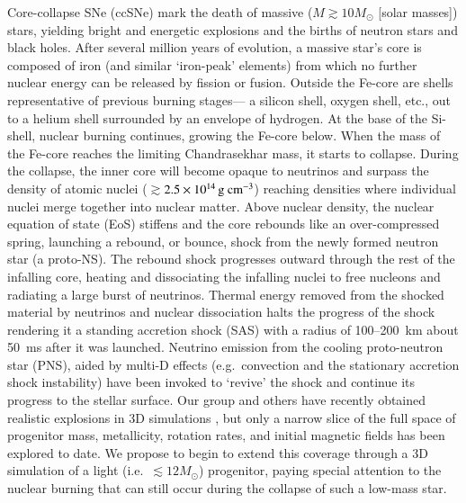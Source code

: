 Core-collapse SNe (ccSNe) mark the death of massive ($M \gtrsim 10
M_{\odot}$ [solar masses]) stars, yielding bright and energetic
explosions and the births of neutron stars and black holes.  After
several million years of evolution, a massive star's core is composed
of iron (and similar `iron-peak' elements) from which no further
nuclear energy can be released by fission or fusion.  Outside the
Fe-core are shells representative of previous burning stages--- a
silicon shell, oxygen shell, etc., out to a helium shell surrounded by
an envelope of hydrogen.  At the base of the Si-shell, nuclear burning
continues, growing the Fe-core below.  When the mass of the Fe-core
reaches the limiting Chandrasekhar mass, it starts to collapse.
During the collapse, the inner core will become opaque to neutrinos
and surpass the density of atomic nuclei
($\gtrsim$$2.5\times10^{14}\,{\mathrm{g~cm^{-3}}}$) reaching densities where
individual nuclei merge together into nuclear matter.  Above nuclear
density, the nuclear equation of state (EoS) stiffens and the core
rebounds like an over-compressed spring, launching a rebound, or
bounce, shock from the newly formed neutron star (a proto-NS).  The
rebound shock progresses outward through the rest of the infalling
core, heating and dissociating the infalling nuclei to free nucleons
and radiating a large burst of neutrinos. Thermal energy removed from
the shocked material by neutrinos and nuclear dissociation halts the
progress of the shock rendering it a standing accretion shock (SAS)
with a radius of 100--200~km about 50~ms after it was
launched. Neutrino emission from the cooling proto-neutron star (PNS),
aided by multi-D effects (e.g.\ convection and the stationary
accretion shock instability) have been invoked to `revive' the shock
and continue its progress to the stellar surface.  Our group and
others have recently obtained realistic explosions in
3D simulations \cite{lentzetal2015,melson}, but only a
narrow slice of the full space of progenitor mass, metallicity,
rotation rates, and initial magnetic fields has been explored to
date. We propose to begin to extend this coverage through a 3D
simulation of a light (i.e.\ $\lesssim 12 M_{\odot}$) progenitor, paying
special attention to the nuclear burning that can still occur during
the collapse of such a low-mass star.
